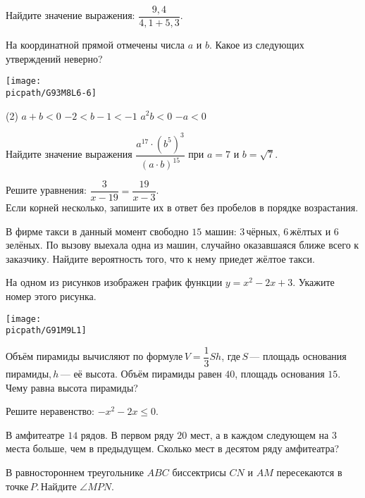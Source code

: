 %
%

\begin{class}[number=1]
	\begin{listofex}
		\item Найдите значение выражения: \(\dfrac{ 9,4 }{ 4,1+5,3 }\).
		\item На координатной прямой отмечены числа \( a \) и \( b \). Какое из следующих утверждений неверно?
		\begin{center}
			\texttt{[image: \\picpath/G93M8L6-6]}
		\end{center}
		\begin{tasks}(2)
			\task \( a+b<0 \)
			\task \( -2<b-1<-1 \)
			\task \( a^2b<0 \)
			\task \( -a<0 \)
		\end{tasks}
		\item Найдите значение выражения \( \dfrac{a^{17}\cdot(b^5)^3}{(a\cdot b)^{15}} \) при \( a=7 \) и \( b=\sqrt{7} \).
		\item Решите уравнения: \(\dfrac{ 3 }{ x-19 }=\dfrac{ 19 }{ x-3 }\). \\
		Если корней несколько, запишите их в ответ без пробелов в порядке возрастания.
		\item В фирме такси в данный момент свободно \(15\) машин: \(3\) чёрных, \(6\) жёлтых и \(6\) зелёных. По вызову выехала одна из машин, случайно оказавшаяся ближе всего к заказчику. Найдите вероятность того, что к нему приедет жёлтое такси.
		\item На одном из рисунков изображен график функции \(y=x^2-2x+3\). Укажите номер этого рисунка.
		\begin{center}
			\texttt{[image: \\picpath/G91M9L1]}
		\end{center}
		\item Объём пирамиды вычисляют по формуле \(V=\dfrac{ 1 }{ 3 }Sh\),  где \(S\) --- площадь основания пирамиды, \(h\) --- её высота. Объём пирамиды равен \(40\), площадь основания \(15\). Чему равна высота пирамиды?
		\item Решите неравенство: \(-x^2-2x\le0\).
		\item В амфитеатре \(14\) рядов. В первом ряду \(20\) мест, а в каждом следующем на \(3\) места больше, чем в предыдущем. Сколько мест в десятом ряду амфитеатра?
		\item В равностороннем треугольнике \(ABC\) биссектрисы \(CN\) и \(AM\) пересекаются в точке \(P\). Найдите \(\angle MPN\).

\end{listofex}
\end{class}
